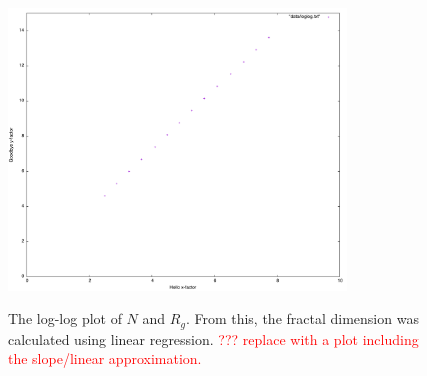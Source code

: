 \begin{figure}
	\begin{center}
		\includegraphics[width = 0.8\textwidth]{fig/loglog.png}
		\label{fig:loglog2d-DLA_1mill}
		\caption{The log-log plot of $N$ and $R_g$. From this, the fractal dimension was calculated using linear regression.  \textcolor{red}{??? replace with a plot including the slope/linear approximation.}}
	\end{center}
\end{figure}

